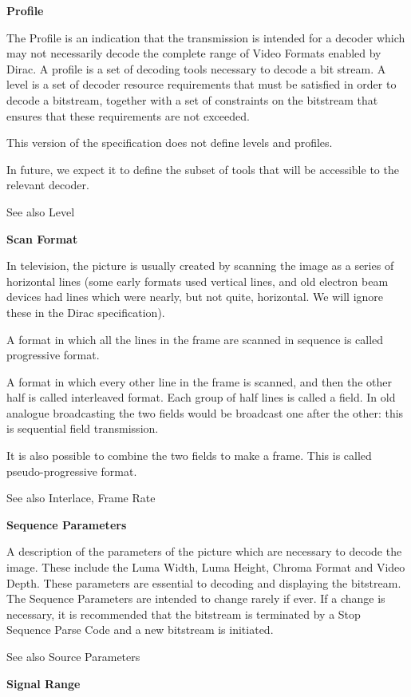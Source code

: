 \textbf{Profile}

The Profile is an indication that the transmission is intended for a
decoder which may not necessarily decode the complete range of Video
Formats enabled by Dirac. A profile is a set of decoding tools necessary
to decode a bit stream. A level is a set of decoder resource
requirements that must be satisfied in order to decode a bitstream,
together with a set of constraints on the bitstream that ensures that
these requirements are not exceeded.

This version of the specification does not define levels and profiles.

In future, we expect it to define the subset of tools that will be
accessible to the relevant decoder.

See also Level

\textbf{Scan Format}

In television, the picture is usually created by scanning the image as a
series of horizontal lines (some early formats used vertical lines, and
old electron beam devices had lines which were nearly, but not quite,
horizontal. We will ignore these in the Dirac specification).

A format in which all the lines in the frame are scanned in sequence is
called progressive format.

A format in which every other line in the frame is scanned, and then the
other half is called interleaved format. Each group of half lines is
called a field.  In old analogue broadcasting the two fields would be
broadcast one after the other: this is sequential field transmission.

It is also possible to combine the two fields to make a frame. This is
called pseudo-progressive format.

See also Interlace, Frame Rate

\textbf{Sequence Parameters}

A description of the parameters of the picture which are necessary to
decode the image. These include the Luma Width, Luma Height, Chroma
Format and Video Depth.  These parameters are essential to decoding and
displaying the bitstream.  The Sequence Parameters are intended to
change rarely if ever. If a change is necessary, it is recommended that
the bitstream is terminated by a Stop Sequence Parse Code and a new
bitstream is initiated.

See also Source Parameters

\textbf{Signal Range}

